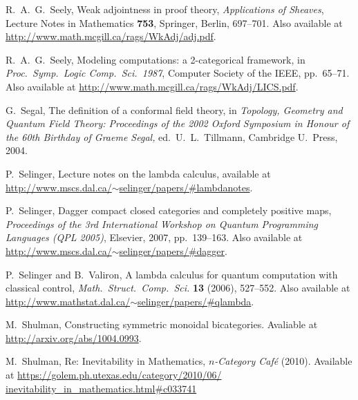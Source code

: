\documentclass[12pt,twoside,openright]{report}
\begin{document}
\begin{thebibliography}{99}
 R.\ A.\ G.\ Seely, Weak adjointness in proof theory,
{\sl Applications of Sheaves}, Lecture Notes in Mathematics {\bf 753}, Springer, Berlin, 697--701.  Also available at \hfill \break
\href{http://www.math.mcgill.ca/rags/WkAdj/adj.pdf}
{http://www.math.mcgill.ca/rags/WkAdj/adj.pdf}.

R.\ A.\ G.\ Seely, Modeling computations: a
2-categorical framework, in {\sl Proc.\ Symp.\ Logic Comp.\ 
Sci.\ 1987}, Computer Society of the IEEE, pp.\ 65--71. Also available at \hfill \break 
\href{http://www.math.mcgill.ca/rags/WkAdj/LICS.pdf}
{http://www.math.mcgill.ca/rags/WkAdj/LICS.pdf}.

 G.\ Segal, The definition of a conformal field theory, in {\sl Topology, Geometry and Quantum Field Theory: Proceedings of the 
2002 Oxford Symposium in Honour of the 60th Birthday of Graeme Segal,} 
ed.\ U.\ L.\ Tillmann, Cambridge U.\ Press, 2004.

 P.\ Selinger, Lecture notes on the lambda calculus, available at \hfill \break
\href{http://www.mscs.dal.ca/~selinger/papers/#lambdanotes}
{http://www.mscs.dal.ca/$\sim$selinger/papers/\#lambdanotes}.

 P.\ Selinger, Dagger compact closed categories and completely positive maps, {\sl Proceedings of the 3rd International Workshop on Quantum Programming Languages (QPL 2005)}, Elsevier, 2007, pp.\ 139--163. Also available at \href{http://www.mscs.dal.ca/~selinger/papers/#dagger}
{http://www.mscs.dal.ca/$\sim$selinger/papers/\#dagger}.

 P.\ Selinger and B.\ Valiron, A lambda calculus for quantum computation with classical control,
{\sl Math.\ Struct.\ Comp.\ Sci.} {\bf 13} (2006), 527--552. Also available at \hfill \break 
\href{http://www.mathstat.dal.ca/~selinger/papers/#qlambda}
{http://www.mathstat.dal.ca/$\sim$selinger/papers/\#qlambda}.

 M.\ Shulman, Constructing symmetric monoidal bicategories.  Avaliable at \href{http://arxiv.org/abs/1004.0993}{http://arxiv.org/abs/1004.0993}.

 M.\ Shulman, Re: Inevitability in Mathematics,
{\sl $n$-Category Caf\'e} (2010).  Available at
\href{https://golem.ph.utexas.edu/category/2010/06/inevitability_in_mathematics.html#c033741}
{https://golem.ph.utexas.edu/category/2010/06/}\\
\href{https://golem.ph.utexas.edu/category/2010/06/inevitability_in_mathematics.html#c033741}
{inevitability\_in\_mathematics.html\#c033741}


\end{thebibliography}
\end{document}
